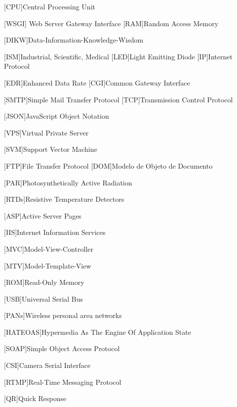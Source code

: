 \begin{multicols}{2}
\begin{acronym}[RELAX NG]
	[CPU]{Central Processing Unit}
	
	[WSGI]{ Web Server Gateway Interface }
	[RAM]{Random Access Memory}
	
	[DIKW]{Data-Information-Knowledge-Wisdom}
	
	[ISM]{Industrial, Scientific, Medical}
	[LED]{Light Emitting Diode}
	[IP]{Internet Protocol}
	
	[EDR]{Enhanced Data Rate}
	[CGI]{Common Gateway Interface}
	
	[SMTP]{Simple Mail Transfer Protocol}
	[TCP]{Transmission Control Protocol}
	
	[JSON]{JavaScript Object Notation}
	
	[VPS]{Virtual Private Server }
	
	[SVM]{Support Vector Machine}
	
	[FTP]{File Transfer Protocol}
	[DOM]{Modelo de Objeto de Documento}
	
	[PAR]{Photosynthetically Active Radiation}
	
	[RTDs]{Resistive Temperature Detectors}
	
	[ASP]{Active Server Pages}
	
	
	[IIS]{Internet Information Services}
	
	[MVC]{Model-View-Controller}
	
	[MTV]{Model-Template-View}
	
	[ROM]{Read-Only Memory}
	
	[USB]{Universal Serial Bus}
	
	[PANs]{Wireless personal area networks}
	
	[HATEOAS]{Hypermedia As The Engine Of Application State}
	
	[SOAP]{Simple Object Access Protocol}

[CSI]{Camera Serial Interface}
	
	[RTMP]{Real-Time Messaging Protocol}
	
	[QR]{Quick Response}
	
	
\end{acronym}

\end{multicols}

